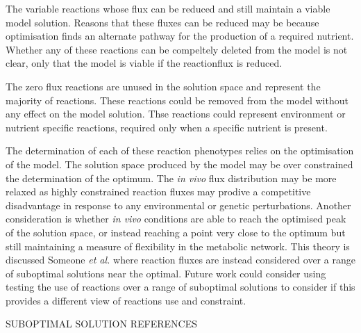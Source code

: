 The variable reactions whose flux can be reduced and still maintain a viable model solution. Reasons that these fluxes can be reduced may be because optimisation finds an alternate pathway for the production of a required nutrient. Whether any of these reactions can be compeltely deleted from the model is not clear, only that the model is viable if the reactionflux is reduced.

The zero flux reactions are unused in the solution space and represent the majority of reactions. These reactions could be removed from the model without any effect on the model solution. Thse reactions could represent environment or nutrient specific reactions, required only when a specific nutrient is present.

The determination of each of these reaction phenotypes relies on the optimisation of the model. The solution space produced by the model may be over constrained the determination of the optimum. The \emph{in vivo} flux distribution may be more relaxed as highly constrained reaction fluxes may prodive a competitive disadvantage in response to any environmental or genetic perturbations. Another consideration is whether \emph{in vivo} conditions are able to reach the optimised peak of the solution space, or instead reaching a point very close to the optimum but still maintaining a measure of flexibility in the metabolic network. This theory is discussed Someone \emph{et al.} \cite{suboptimal_solutions} where reaction fluxes are instead considered over a range of suboptimal solutions near the optimal. Future work could consider using testing the use of reactions over a range of suboptimal solutions to consider if this provides a different view of reactions use and constraint.

SUBOPTIMAL SOLUTION REFERENCES

